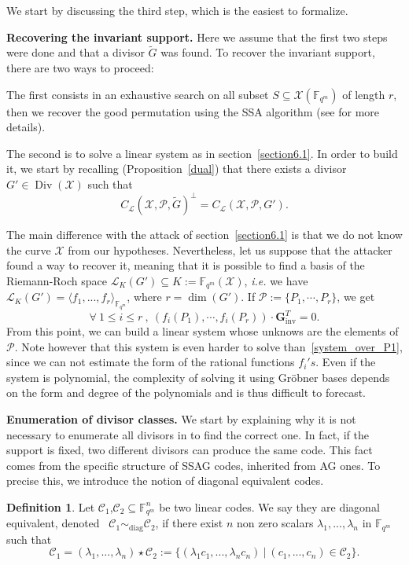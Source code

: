 \documentclass[10pt]{article}
\theoremstyle{definition}
\theoremstyle{definition}
\theoremstyle{definition}
\newtheorem{def1}[thm]{Definition}
\newcommand{\cd}{\cdot}
\newcommand{\C}{\mathcal{C}}
\newcommand{\Fqm}{\mathbb{F}_{q^m}}
\newcommand{\su}{\subseteq}
\newcommand{\X}{\mathcal{X}}
\newcommand{\PR}{\mathcal{P}}
\newcommand{\Div}{\operatorname{Div}}
\newcommand{\calL}{\mathcal{L}}
\begin{document}
We start by discussing the third step, which is the easiest to formalize. 



 \textbf{Recovering the invariant support.} Here we assume that the first two steps were done and that a divisor $\tilde{G}$ was found. To recover the invariant support, there are two ways to proceed: 



 The first consists in an exhaustive search on all subset $S \su \X(\Fqm)$ of length $r$, then we recover the good permutation using the SSA algorithm (see \cite{SSA} for more details). 



 The second is to solve a linear system as in section~\ref{section6.1}. In order to build it, we start by recalling (Proposition~\ref{dual}) that there exists a divisor $G' \in  \Div(\X)$ such that 
\[ C_{\calL}(\X,\PR,\tilde{G})^{\perp} = C_{\calL}(\X,\PR,G').\]

 The main difference with the attack of section~\ref{section6.1} is that we do not know the curve $\X$ from our hypotheses. Nevertheless, let us suppose that the attacker found a way to recover it, meaning that it is possible to find a basis of the Riemann-Roch space $\calL_K(G') \su K:=\Fqm(\X)$, \textit{i.e.} we have $\calL_K(G') = \langle f_1,...,f_r \rangle_{\Fqm}$, where $r = \dim(G')$. If $\PR := \{P_1,\cdots,P_r\}$, we get 
\begin{equation*}
\forall \ 1 \leq i \leq r \ , \ (f_i(P_1),\cdots,f_i(P_r)) \cd \mathbf{G}_{\mathrm{inv}}^T = 0.
\end{equation*}
From this point, we can build a linear system whose unknows are the elements of $\PR$.
Note however that this system is even harder to solve than~\eqref{system_over_P1}, since we can not estimate the form of the rational functions $f_i's$. Even if the system is polynomial, the complexity of solving it using Gröbner bases depends on the form and degree of the polynomials and is thus difficult to forecast.



 \textbf{Enumeration of divisor classes.} We start by explaining why it is not necessary to enumerate all divisors in to find the correct one. In fact, if the support is fixed, two different divisors can produce the same code. This fact comes from the specific structure of SSAG codes, inherited from AG ones. To precise this, we introduce the notion of diagonal equivalent codes.

\begin{def1} \label{diag}
Let $\C_1$,$\C_2 \su \Fqm^n$ be two linear codes. We say they are diagonal equivalent, denoted \ $\C_1 \sim_{\mathrm{diag}} \C_2$, if there exist $n$ non zero scalars $\lambda_1,...,\lambda_n$ in $\Fqm$ such that 
\[\C_1 = (\lambda_1,...,\lambda_n) \star \C_2 := \{(\lambda_1c_1,...,\lambda_nc_n) \ | \ (c_1,...,c_n) \in \C_2\}.\]
\end{def1} 
\end{document}
